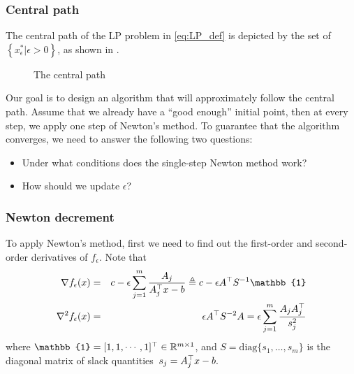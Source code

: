 \subsubsection{Central path}
The central path of the LP problem in \ref{eq:LP_def} is depicted by the set of
$\left\{x^*_\epsilon|\epsilon>0\right\}$, as shown in .
\begin{figure}[h!]
\centering
{}
\caption{The central path\label{fig:central_path}}
\end{figure}

Our goal is to design an algorithm that will approximately follow the central
path. Assume that we already have a ``good enough'' initial point, then at every step, we apply one step of Newton's method. To guarantee that the algorithm converges, we need to answer the following two questions:
\begin{itemize}
\item Under what conditions does the single-step Newton method work?
\item How should we update $\epsilon$?
\end{itemize}

\subsubsection{Newton decrement}
To apply Newton's method, first we need to find out the first-order and second-order derivatives of $f_\epsilon$. Note that
\begin{eqnarray}
\nabla f_\epsilon(x)&=&c-\epsilon \sum_{j=1}^m \dfrac{A_j}{A^\trans_j x-b}\triangleq c-\epsilon A^\trans S^{-1}\mathbb{1}\label{eq:grad_f_eps}\\
\nabla^2f_\epsilon(x)&=&\epsilon A^\trans S^{-2}A=\epsilon
\sum_{j=1}^m\dfrac{A_j A_j^\trans}{s_j^2}\label{eq:hessian_f_eps}
\end{eqnarray}
where $\mathbb{1}=[1,1,\cdots,1]^\trans\in\mathbb{R}^{m\times1}$, 
and $S=\mathrm{diag}\{s_1,\dots,s_m\}$ is the diagonal matrix of slack
quantities~$s_j= A_j^\top x - b.$

